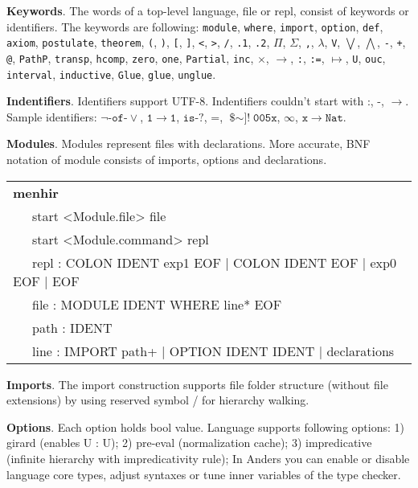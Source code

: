 \documentclass{article}
\theoremstyle{definition}
\newcommand{\tabstyle}[0]{\scriptsize\ttfamily\fontseries{l}\selectfont}
\begin{document}
\textbf{Keywords}. The words of a top-level language, file or repl, consist of keywords or identifiers.
The keywords are following: \texttt{module}, \texttt{where}, \texttt{import}, \texttt{option}, \texttt{def}, \texttt{axiom},
\texttt{postulate}, \texttt{theorem}, \texttt{(}, \texttt{)}, \texttt{[}, \texttt{]}, \texttt{<}, \texttt{>},
\texttt{/}, \texttt{.1}, \texttt{.2}, \texttt{$\Pi$}, \texttt{$\Sigma$}, \texttt{,}, \texttt{$\lambda$},
\texttt{V}, \texttt{$\bigvee$}, \texttt{$\bigwedge$}, \texttt{-}, \texttt{+}, \texttt{@}, \texttt{PathP},
\texttt{transp}, \texttt{hcomp}, \texttt{zero}, \texttt{one}, \texttt{Partial}, \texttt{inc},
\texttt{$\times$}, \texttt{$\rightarrow$}, \texttt{:}, \texttt{:=}, \texttt{$\mapsto$}, \texttt{U},
\texttt{ouc}, \texttt{interval}, \texttt{inductive}, \texttt{Glue}, \texttt{glue}, \texttt{unglue}.

\textbf{Indentifiers}. Identifiers support UTF-8. Indentifiers couldn't
start with $\texttt{:}$, $\texttt{-}$, $\rightarrow$. Sample identifiers:
$\neg\texttt{-of-}\vee$, $\texttt{1}$$\rightarrow$$\texttt{1}$, $\texttt{is-?}$,
$\texttt{=}$, $\texttt{\$$\sim$]!}$$\texttt{005x}$, $\infty$, $\texttt{x}$$\rightarrow$$\texttt{Nat}$.

\textbf{Modules}. Modules represent files with declarations. More accurate, BNF notation of module consists of imports, options and declarations.
\begin{table}[ht]
\tabstyle
\begin{tabular}{l}
\textbf{menhir} \\
\ \ \ start <Module.file> file \\
\ \ \ start <Module.command> repl \\
\ \ \ repl : COLON IDENT exp1 EOF | COLON IDENT EOF | exp0 EOF | EOF \\
\ \ \ file : MODULE IDENT WHERE line* EOF \\
\ \ \ path : IDENT \\
\ \ \ line : IMPORT path+ | OPTION IDENT IDENT | declarations \\
\end{tabular}
\end{table}

\textbf{Imports}. The import construction supports file folder structure (without file extensions)
by using reserved symbol / for hierarchy walking.

\textbf{Options}. Each option holds bool value. Language supports following options:
1) girard (enables U : U);
2) pre-eval (normalization cache);
3) impredicative (infinite hierarchy with impredicativity rule);
In Anders you can enable or disable language core types, adjust syntaxes or
tune inner variables of the type checker.
\end{document}
